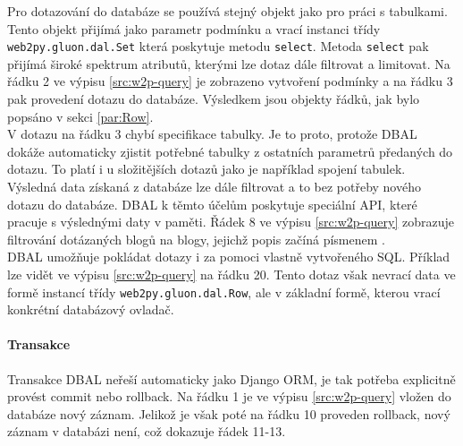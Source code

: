 \documentclass[ing,male,java,dept456]{diploma}						%
\begin{document}
Pro dotazování do databáze se používá stejný objekt jako pro práci s tabulkami. Tento objekt přijímá jako parametr podmínku a vrací instanci třídy \lstinline[style=inlinepython]|web2py.gluon.dal.Set| která poskytuje metodu \lstinline[style=inlinepython]|select|. Metoda \lstinline[style=inlinepython]|select| pak přijímá široké spektrum atributů, kterými lze dotaz dále filtrovat a limitovat. Na řádku 2 ve výpisu \ref{src:w2p-query} je zobrazeno vytvoření podmínky a na řádku 3 pak provedení dotazu do databáze. Výsledkem jsou objekty řádků, jak bylo popsáno v sekci \ref{par:Row}. \\
V dotazu na řádku 3 chybí specifikace tabulky. Je to proto, protože DBAL dokáže automaticky zjistit potřebné tabulky z ostatních parametrů předaných do dotazu. To platí i u složitějších dotazů jako je například spojení tabulek. \\
Výsledná data získaná z databáze lze dále filtrovat a to bez potřeby nového dotazu do databáze. DBAL k těmto účelům poskytuje speciální API, které pracuje s výslednými daty v paměti. Řádek 8 ve výpisu \ref{src:w2p-query} zobrazuje filtrování dotázaných blogů na blogy, jejichž popis začíná písmenem . \\
DBAL umožňuje pokládat dotazy i za pomoci vlastně vytvořeného SQL. Příklad lze vidět ve výpisu \ref{src:w2p-query} na řádku 20. Tento dotaz však nevrací data ve formě instancí třídy \lstinline[style=inlinepython]|web2py.gluon.dal.Row|, ale v základní formě, kterou vrací konkrétní databázový ovladač. \\

\paragraph{Transakce} 
Transakce DBAL neřeší automaticky jako Django ORM, je tak potřeba explicitně provést commit nebo rollback. Na řádku 1 je ve výpisu \ref{src:w2p-query} vložen do databáze nový záznam. Jelikož je však poté na řádku 10 proveden rollback, nový záznam v databázi není, což dokazuje řádek 11-13.
\end{document}
